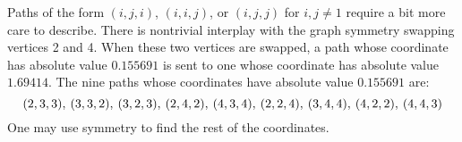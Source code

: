 Paths of the form $(i,j,i)$, $(i,i,j)$, or $(i,j,j)$ for $i,j\neq1$ require a bit more care to describe. 
There is nontrivial interplay with the graph symmetry swapping vertices 2 and 4. 
When these two vertices are swapped, a path whose coordinate has absolute value $0.155691$ is sent to one whose coordinate has absolute value $1.69414$. 
The nine paths whose coordinates have absolute value $0.155691$ are:
\[
    (2,3,3),\hspace{0.2em} (3,3,2),\hspace{0.2em} (3,2,3),\hspace{0.2em} (2,4,2),\hspace{0.2em} (4,3,4),\hspace{0.2em} (2,2,4),\hspace{0.2em} (3,4,4),\hspace{0.2em} (4,2,2),\hspace{0.2em} (4,4,3) 
\]
One may use symmetry to find the rest of the coordinates.


